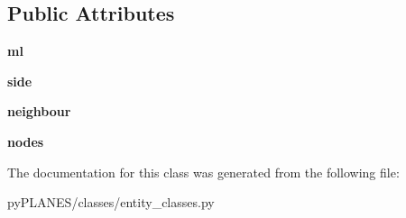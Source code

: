 \subsection*{Public Attributes}
\begin{DoxyCompactItemize}
\item 
\mbox{\label{classpy_p_l_a_n_e_s_1_1classes_1_1entity__classes_1_1_interface_fem_acdecea8fdcb355a5f49a9c80fac4812f}} 
{\bfseries ml}
\item 
\mbox{\label{classpy_p_l_a_n_e_s_1_1classes_1_1entity__classes_1_1_interface_fem_a5d9c488496e682725300f8ba4d451846}} 
{\bfseries side}
\item 
\mbox{\label{classpy_p_l_a_n_e_s_1_1classes_1_1entity__classes_1_1_interface_fem_a834937e0475167da27ac376c33556ea6}} 
{\bfseries neighbour}
\item 
\mbox{\label{classpy_p_l_a_n_e_s_1_1classes_1_1entity__classes_1_1_interface_fem_a74174476572b552729fd4875735ea32c}} 
{\bfseries nodes}
\end{DoxyCompactItemize}


The documentation for this class was generated from the following file\+:\begin{DoxyCompactItemize}
\item 
py\+P\+L\+A\+N\+E\+S/classes/entity\+\_\+classes.\+py\end{DoxyCompactItemize}
